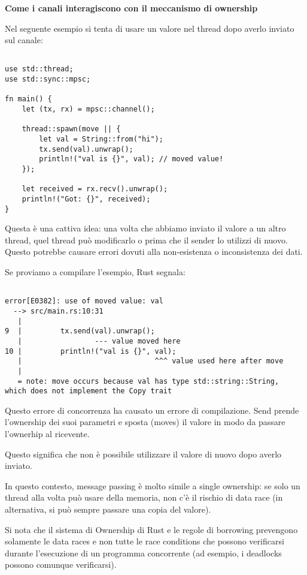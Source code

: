 \textbf{Come i canali interagiscono con il meccanismo di ownership}

Nel seguente esempio si tenta di usare un valore nel thread dopo averlo inviato
sul canale:

\begin{verbatim}

use std::thread;
use std::sync::mpsc;

fn main() {
    let (tx, rx) = mpsc::channel();

    thread::spawn(move || {
        let val = String::from("hi");
        tx.send(val).unwrap();
        println!("val is {}", val); // moved value!
    });

    let received = rx.recv().unwrap();
    println!("Got: {}", received);
}
\end{verbatim}

Questa è una cattiva idea: una volta che abbiamo inviato il valore a un altro
thread, quel thread può modificarlo o prima che il sender
lo utilizzi di nuovo. Questo potrebbe causare errori dovuti alla non-esistenza
o inconsistenza dei dati.

Se proviamo a compilare l'esempio, Rust segnala:


\begin{verbatim}

error[E0382]: use of moved value: val
  --> src/main.rs:10:31
   |
9  |         tx.send(val).unwrap();
   |                 --- value moved here
10 |         println!("val is {}", val);
   |                               ^^^ value used here after move
   |
   = note: move occurs because val has type std::string::String,
which does not implement the Copy trait

\end{verbatim}

Questo errore di concorrenza ha causato un errore di compilazione.
Send prende l'ownership dei suoi parametri e sposta (moves) il valore
in modo da passare l'ownerhip al ricevente.

Questo significa che non è possibile utilizzare il valore di nuovo dopo averlo
inviato.

In questo contesto, message passing è molto simile a single ownership: se solo
un thread alla volta può usare della memoria, non c'è il rischio di data race
(in alternativa, si può sempre passare una copia del valore).

Si nota che il sistema di Ownership di Rust e le regole di borrowing prevengono
solamente le data races e non tutte le race conditions che possono verificarsi
durante l'esecuzione di un programma concorrente (ad esempio, i deadlocks possono
comunque verificarsi).

